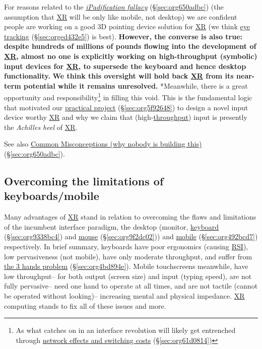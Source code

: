 \documentclass[logo,bsc,singlespacing,parskip]{infthesis}
\begin{document}
For reasons related to the \emph{\hyperref[ipadification fallacy]{iPadification fallacy}} (\S \ref{sec:org650adbc}) (the assumption that \hyperref[org39cbd51]{XR} will be only like mobile, not desktop) we are confident people are working on a good 3D pointing device solution for \hyperref[org39cbd51]{XR} (we think \hyperref[sec:orged432e5]{eye tracking} (\S \ref{sec:orged432e5}) is best).
\textbf{However, the converse is also true: despite hundreds of millions of pounds flowing into the development of \hyperref[org39cbd51]{XR}, almost no one is explicitly working on high-throughput (symbolic) input devices for \hyperref[org39cbd51]{XR}, to supersede the keyboard and hence desktop functionality.}
\textbf{We think this oversight will hold back \hyperref[org39cbd51]{XR} from its near-term potential while it remains unresolved.}
*Meanwhile, there is a great opportunity and responsibility\footnote{As what catches on in an interface revolution will likely get entrenched through \hyperref[sec:org61d0814]{network effects and switching costs} (\S \ref{sec:org61d0814})} in filling this void.
This is the fundamental logic that motivated our \hyperref[sec:org5f92648]{practical project} (\S \ref{sec:org5f92648}) to design a novel input device worthy \hyperref[org39cbd51]{XR} and why we claim that (high-\hyperref[throughput]{throughput}) input is presently the \emph{Achilles heel} of \hyperref[org39cbd51]{XR}.

See also \hyperref[sec:org650adbc]{Common Misconceptions (why nobody is building this)} (\S \ref{sec:org650adbc}).
\subsection{Overcoming the limitations of keyboards/mobile}
\label{sec:org85bf0b5}
Many advantages of \hyperref[org39cbd51]{XR} stand in relation to overcoming the flaws and limitations of the incumbent interface paradigm, the desktop (monitor, \hyperref[sec:org9338bc4]{keyboard} (\S \ref{sec:org9338bc4}) and \hyperref[sec:org9f2dc02]{mouse} (\S \ref{sec:org9f2dc02})) and \hyperref[sec:org492bcd7]{mobile} (\S \ref{sec:org492bcd7}) respectively.
In brief summary, keyboards have poor ergonomics (causing \hyperref[org77f0234]{RSI}), low pervasiveness (not mobile), have only moderate throughput, and suffer from \hyperref[sec:org4bd894e]{the 3 hands problem} (\S \ref{sec:org4bd894e}).
Mobile touchscreens meanwhile, have low throughput-- for both output (screen size) and input (typing speed), are not fully pervasive-- need one hand to operate at all times, and are not tactile (cannot be operated without looking)-- increasing mental and physical impedance.
\hyperref[org39cbd51]{XR} computing stands to fix all of these issues and more.
\end{document}
